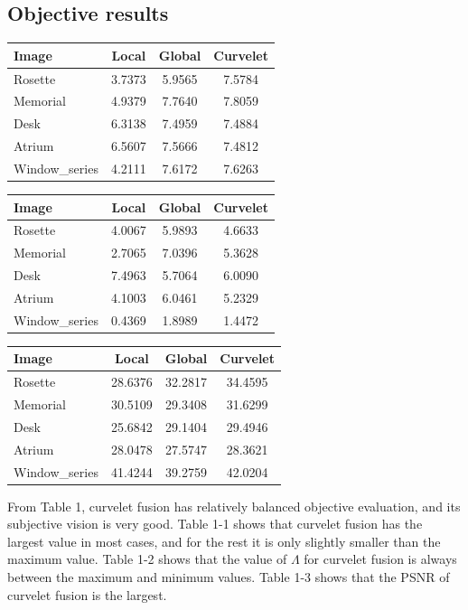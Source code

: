 \documentclass[11pt]{article}
\begin{document}
\subsection{Objective results}

\begin{center}
\begin{tabular}{lccc}
\hline
Image & Local & Global & Curvelet \\
\hline
Rosette & 3.7373 & 5.9565 & 7.5784 \\
Memorial & 4.9379 & 7.7640 & 7.8059 \\
Desk & 6.3138 & 7.4959 & 7.4884 \\
Atrium & 6.5607 & 7.5666 & 7.4812 \\
Window\_series & 4.2111 & 7.6172 & 7.6263 \\
\hline
\end{tabular}
\end{center}

\begin{center}
\begin{tabular}{lccc}
\hline
Image & Local & Global & Curvelet \\
\hline
Rosette & 4.0067 & 5.9893 & 4.6633 \\
Memorial & 2.7065 & 7.0396 & 5.3628 \\
Desk & 7.4963 & 5.7064 & 6.0090 \\
Atrium & 4.1003 & 6.0461 & 5.2329 \\
Window\_series & 0.4369 & 1.8989 & 1.4472 \\
\hline
\end{tabular}
\end{center}

\begin{center}
\begin{tabular}{lccc}
\hline
Image & Local & Global & Curvelet \\
\hline
Rosette & 28.6376 & 32.2817 & 34.4595 \\
Memorial & 30.5109 & 29.3408 & 31.6299 \\
Desk & 25.6842 & 29.1404 & 29.4946 \\
Atrium & 28.0478 & 27.5747 & 28.3621 \\
Window\_series & 41.4244 & 39.2759 & 42.0204 \\
\hline
\end{tabular}
\end{center}

From Table 1, curvelet fusion has relatively balanced objective evaluation, and its subjective vision is very good. Table 1-1 shows that curvelet fusion has the largest value in most cases, and for the rest it is only slightly smaller than the maximum value. Table 1-2 shows that the value of $\Lambda$ for curvelet fusion is always between the maximum and minimum values. Table 1-3 shows that the PSNR of curvelet fusion is the largest.
\end{document}
